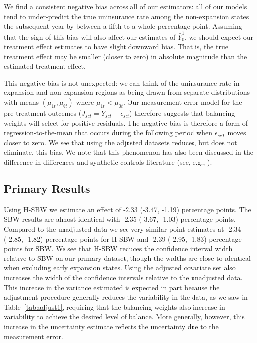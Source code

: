 \documentclass[aoas]{imsart}
\theoremstyle{plain}
\theoremstyle{remark}
\begin{document}
We find a consistent negative bias across all of our estimators: all of our models tend to under-predict the true uninsurance rate among the non-expansion states the subsequent year by between a fifth to a whole percentage point. Assuming that the sign of this bias will also affect our estimates of $\bar{Y}^1_0$, we should expect our treatment effect estimates to have slight downward bias. That is, the true treatment effect may be smaller (closer to zero) in absolute magnitude than the estimated treatment effect. 

This negative bias is not unexpected: we can think of the uninsurance rate in expansion and non-expansion regions as being drawn from separate distributions with means $(\mu_{1t}, \mu_{0t})$ where $\mu_{1t} < \mu_{0t}$. Our measurement error model for the pre-treatment outcomes ($J_{sct} = Y_{sct} + \epsilon_{sct}$) therefore suggests that balancing weights will select for positive residuals. The negative bias is therefore a form of regression-to-the-mean that occurs during the following period when $\epsilon_{scT}$ moves closer to zero. We see that using the adjusted datasets reduces, but does not eliminate, this bias. We note that this phenomenon has also been discussed in the difference-in-differences and synthetic controls literature (see, e.g., \cite{daw2018matching}). 

\subsection{Primary Results}

Using H-SBW we estimate an effect of -2.33 (-3.47, -1.19) percentage points. The SBW results are almost identical with -2.35 (-3.67, -1.03) percentage points. Compared to the unadjusted data we see very similar point estimates at -2.34 (-2.85, -1.82) percentage points for H-SBW and -2.39 (-2.95, -1.83) percentage points for SBW. We see that H-SBW reduces the confidence interval width relative to SBW on our primary dataset, though the widths are close to identical when excluding early expansion states. Using the adjusted covariate set also increases the width of the confidence intervals relative to the unadjusted data. This increase in the variance estimated is expected in part because the adjustment procedure generally reduces the variability in the data, as we saw in Table~\ref{tab:adjust1}, requiring that the balancing weights also increase in variability to achieve the desired level of balance. More generally, however, this increase in the uncertainty estimate reflects the uncertainty due to the measurement error.
\end{document}
